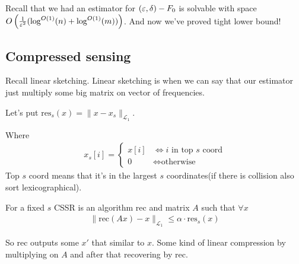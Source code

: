 \begin{remrk}
	Recall that we had an estimator for $(\varepsilon, \delta)-F_0$ is solvable with space $O\left(\frac{1}{\varepsilon^2} (\log^{O(1)}(n) + \log^{O(1)}(m))\right)$.
	And now we've proved tight lower bound!
\end{remrk}

\subsection{Compressed sensing}

Recall linear sketching.
Linear sketching is when we can say that our estimator just multiply some big matrix on vector of frequencies.

\begin{df}

	Let's put $\text{res}_s(x) = \| x - x_s \|_{\mathcal L_1}$.
	
	Where
	\begin{align*}
		x_s[i] = \begin{cases}
			x[i] &\iff i \text{ in top $s$ coord} \\
			0 &\iff \text{otherwise}
		\end{cases}
	\end{align*}
	Top $s$ coord means that it's in the largest $s$ coordinates(if there is collision also sort lexicographical).
	
	For a fixed $s$ CSSR is an algorithm rec and matrix $A$ such that $\forall x$
	\begin{align*}
		\| \text{rec}(Ax) - x\|_{\mathcal L_1} \leq \alpha \cdot  \text{res}_s(x)
	\end{align*}
	
	So rec outputs some $x'$ that similar to $x$.
	Some kind of linear compression by multiplying on $A$ and after that recovering by rec.
\end{df}

